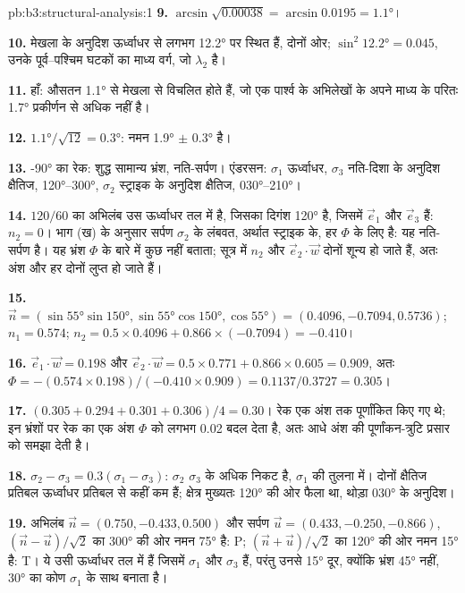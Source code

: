 \begin{solution}{pb:b3:structural-analysis:1}
\textbf{9.} $\arcsin\sqrt{0.00038} = \arcsin0.0195 = \ang{1.1}$।

\textbf{10.} मेखला के अनुदिश  ऊर्ध्वाधर से लगभग \ang{12.2} पर स्थित हैं,
दोनों ओर; $\sin^2\ang{12.2} = 0.045$, उनके पूर्व--पश्चिम घटकों का
माध्य वर्ग, जो $\lambda_2$ है।

\textbf{11.} हाँ:  औसतन \ang{1.1} से मेखला से विचलित होते हैं, जो
एक पार्श्व के अभिलेखों के अपने माध्य के परितः \ang{1.7} प्रकीर्णन से अधिक नहीं है।

\textbf{12.} $\ang{1.1}/\sqrt{12} = \ang{0.3}$: नमन \ang{1.9} $\pm$
\ang{0.3} है।

\textbf{13.} \ang{-90} का रेक: शुद्ध सामान्य भ्रंश, नति-सर्पण। एंडरसन:
$\sigma_1$ ऊर्ध्वाधर, $\sigma_3$ नति-दिशा के अनुदिश क्षैतिज,
\ang{120}--\ang{300}, $\sigma_2$ स्ट्राइक के अनुदिश क्षैतिज,
\ang{030}--\ang{210}।

\textbf{14.} $120/60$ का अभिलंब उस ऊर्ध्वाधर तल में है, जिसका दिगंश
\ang{120} है, जिसमें $\vec e_1$ और $\vec e_3$ हैं: $n_2 = 0$। भाग (ख) के अनुसार
सर्पण $\sigma_2$ के लंबवत, अर्थात स्ट्राइक के, हर $\Phi$ के लिए है: यह
नति-सर्पण है। यह भ्रंश $\Phi$ के बारे में कुछ नहीं बताता; सूत्र में $n_2$ और
$\vec e_2\cdot\vec w$ दोनों शून्य हो जाते हैं, अतः अंश और हर दोनों लुप्त हो जाते हैं।

\textbf{15.} $\vec n = (\sin\ang{55}\sin\ang{150}, \sin\ang{55}\cos\ang{150},
\cos\ang{55}) = (0.4096, -0.7094, 0.5736)$; $n_1 = 0.574$; $n_2 = 0.5\times
0.4096 + 0.866\times(-0.7094) = -0.410$।

\textbf{16.} $\vec e_1\cdot\vec w = 0.198$ और $\vec e_2\cdot\vec w = 0.5\times
0.771 + 0.866\times0.605 = 0.909$, अतः $\Phi = -(0.574\times0.198)/(-0.410\times
0.909) = 0.1137/0.3727 = 0.305$।

\textbf{17.} $(0.305 + 0.294 + 0.301 + 0.306)/4 = 0.30$। रेक
एक अंश तक पूर्णांकित किए गए थे; इन भ्रंशों पर रेक का एक अंश $\Phi$ को लगभग 0.02
बदल देता है, अतः आधे अंश की पूर्णांकन-त्रुटि प्रसार को समझा देती है।

\textbf{18.} $\sigma_2 - \sigma_3 = 0.3(\sigma_1 - \sigma_3)$: $\sigma_2$
$\sigma_3$ के अधिक निकट है, $\sigma_1$ की तुलना में। दोनों क्षैतिज प्रतिबल
ऊर्ध्वाधर प्रतिबल से कहीं कम हैं; क्षेत्र मुख्यतः \ang{120} की ओर फैला था,
थोड़ा \ang{030} के अनुदिश।

\textbf{19.} अभिलंब $\vec n = (0.750, -0.433, 0.500)$ और सर्पण $\vec u =
(0.433, -0.250, -0.866)$, $(\vec n - \vec u)/\sqrt2$ का \ang{300} की ओर नमन
\ang{75} है: P; $(\vec n + \vec u)/\sqrt2$ का \ang{120} की ओर नमन \ang{15} है:
T। ये उसी ऊर्ध्वाधर तल में हैं जिसमें $\sigma_1$ और $\sigma_3$ हैं, परंतु
उनसे \ang{15} दूर, क्योंकि भ्रंश \ang{45} नहीं, \ang{30} का कोण
$\sigma_1$ के साथ बनाता है।


\end{solution}
